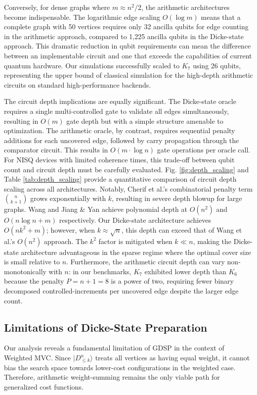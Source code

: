 \documentclass{ieeeaccess}
\begin{document}
Conversely, for dense graphs where $m \approx n^2/2$, the arithmetic architectures become indispensable. The logarithmic edge scaling $O(\log m)$ means that a complete graph with 50 vertices requires only 32 ancilla qubits for edge counting in the arithmetic approach, compared to 1,225 ancilla qubits in the Dicke-state approach. This dramatic reduction in qubit requirements can mean the difference between an implementable circuit and one that exceeds the capabilities of current quantum hardware. Our simulations successfully scaled to $K_7$ using 26 qubits, representing the upper bound of classical simulation for the high-depth arithmetic circuits on standard high-performance backends.

The circuit depth implications are equally significant. The Dicke-state oracle requires a single multi-controlled gate to validate all edges simultaneously, resulting in $O(m)$ gate depth but with a simple structure amenable to optimization. The arithmetic oracle, by contrast, requires sequential penalty additions for each uncovered edge, followed by carry propagation through the comparator circuit. This results in $O(m \cdot \log n)$ gate operations per oracle call. For NISQ devices with limited coherence times, this trade-off between qubit count and circuit depth must be carefully evaluated. Fig. \ref{fig:depth_scaling} and Table \ref{tab:depth_scaling} provide a quantitative comparison of circuit depth scaling across all architectures. Notably, Cherif et al.'s combinatorial penalty term $\binom{n}{k+1}$ grows exponentially with $k$, resulting in severe depth blowup for large graphs. Wang \cite{wang_quantum_2023} and Jiang \& Yan achieve polynomial depth at $O(n^2)$ and $O(n \log n + m)$ respectively. Our Dicke-state architecture achieves $O(nk^2 + m)$; however, when $k \approx \sqrt{n}$, this depth can exceed that of Wang et al.'s $O(n^2)$ approach. The $k^2$ factor is mitigated when $k \ll n$, making the Dicke-state architecture advantageous in the sparse regime where the optimal cover size is small relative to $n$. Furthermore, the arithmetic circuit depth can vary non-monotonically with $n$: in our benchmarks, $K_7$ exhibited lower depth than $K_6$ because the penalty $P = n+1 = 8$ is a power of two, requiring fewer binary decomposed controlled-increments per uncovered edge despite the larger edge count.

\subsection{Limitations of Dicke-State Preparation}
Our analysis reveals a fundamental limitation of GDSP in the context of Weighted MVC. Since $|D_{\le k}^n\rangle$ treats all vertices as having equal weight, it cannot bias the search space towards lower-cost configurations in the weighted case. Therefore, arithmetic weight-summing remains the only viable path for generalized cost functions.
\end{document}
